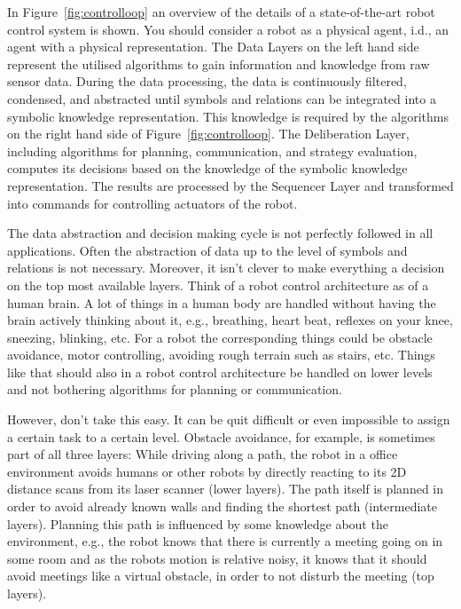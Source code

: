 In Figure~\ref{fig:controlloop} an overview of the details of a state-of-the-art robot control system is shown. You should consider a robot as a physical agent, i.d., an agent with a physical representation. The Data Layers on the left hand side represent the utilised algorithms to gain information and knowledge from raw sensor data. During the data processing, the data is continuously filtered, condensed, and abstracted until symbols and relations can be integrated into a symbolic knowledge representation. This knowledge is required by the algorithms on the right hand side of Figure~\ref{fig:controlloop}. The Deliberation Layer, including algorithms for planning, communication, and strategy evaluation, computes its decisions based on the knowledge of the symbolic knowledge representation. The results are processed by the Sequencer Layer and transformed into commands for controlling actuators of the robot.

The data abstraction and decision making cycle is not perfectly followed in all applications. Often the abstraction of data up to the level of symbols and relations is not necessary. Moreover, it isn't clever to make everything a decision on the top most available layers. Think of a robot control architecture as of a human brain. A lot of things in a human body are handled without having the brain actively thinking about it, e.g., breathing, heart beat, reflexes on your knee, sneezing, blinking, etc. For a robot the corresponding things could be obstacle avoidance, motor controlling, avoiding rough terrain such as stairs, etc. Things like that should also in a robot control architecture be handled on lower levels and not bothering algorithms for planning or communication.

However, don't take this easy. It can be quit difficult or even impossible to assign a certain task to a certain level. Obstacle avoidance, for example, is sometimes part of all three layers: While driving along a path, the robot in a office environment avoids humans or other robots by directly reacting to its 2D distance scans from its laser scanner (lower layers). The path itself is planned in order to avoid already known walls and finding the shortest path (intermediate layers). Planning this path is influenced by some knowledge about the environment, e.g., the robot knows that there is currently a meeting going on in some room and as the robots motion is relative noisy, it knows that it should avoid meetings like a virtual obstacle, in order to not disturb the meeting (top layers).

